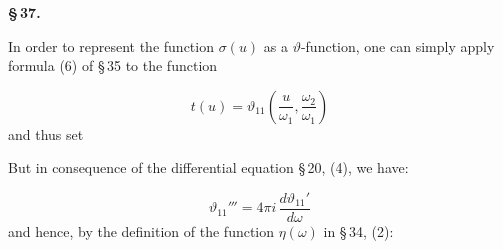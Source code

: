 \begin{center}
\textbf{\S\,37. }
\end{center}

In order to represent the function $\sigma(u)$ as a $\vartheta$-function, one can simply apply formula (6) of \S\,35 to the function

\[
t(u) = \vartheta_{11}\left(\frac{u}{\omega_1}, \frac{\omega_2}{\omega_1}\right)
\]
and thus set

But in consequence of the differential equation \S\,20, (4), we have:

\[
\vartheta_{11}''' = 4\pi i\, \frac{d\vartheta_{11}'}{d\omega}
\]
and hence, by the definition of the function $\eta(\omega)$ in \S\,34, (2):

